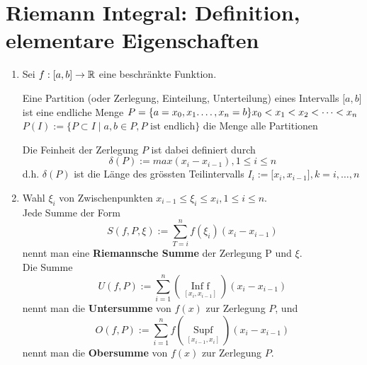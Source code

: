 \section{Riemann Integral: Definition, elementare Eigenschaften}
\begin{enumerate}
\item Sei $f: \lbrack a,b\rbrack\to\mathbb{R}$ eine beschränkte Funktion.\\

\begin{definition}{6.1}
Eine Partition (oder Zerlegung, Einteilung, Unterteilung) eines Intervalls $\lbrack a,b\rbrack$ ist eine endliche Menge $P=\{a=x_0,x_1.\dots,x_n=b \}\\
x_0 < x_1 < x_2 < \dots < x_n$ \\
$P(I):=\{P\subset I \mid a,b\in P, P \text{ ist endlich}\}$ die Menge alle Partitionen \begin{center}
\end{center}
\end{definition}

Die Feinheit der Zerlegung $P$ ist dabei definiert durch \[\delta (P):=max(x_i - x_{i-1}), 1\leq i \leq n\] d.h. $\delta (P)$ ist die Länge des grössten Teilintervalls $I_i:=\lbrack x_i,x_{i-1}\rbrack , k=i,\dots,n$

\item Wahl $\xi_i$ von Zwischenpunkten  $x_{i-1} \leq \xi_i  \leq x_i, 1\leq i \leq n$.\\
Jede Summe der Form \[S(f,P,\xi):=\sum\limits_{T = i}^n {f({\xi _i})} ({x_i} - {x_{i - 1}})\] nennt man eine \textbf{Riemannsche Summe} der Zerlegung P und $\xi$.\\
Die Summe \[U(f,P):=\sum\limits_{i = 1}^n {(\mathop {{\text{Inf }}f}\limits_{[{x_i},{x_{i - 1}}]} )} ({x_i} - {x_{i - 1}})\] nennt man die \textbf{Untersumme} von $f(x)$ zur Zerlegung $P$, und \[O(f,P):=\sum\limits_{i = 1}^n {f(\mathop {{\text{Sup}}f}\limits_{[{x_{i - 1}},{x_{i}}]} )} ({x_i} - {x_{i - 1}})\] nennt man die \textbf{Obersumme} von $f(x)$ zur Zerlegung $P$.


\end{enumerate}
